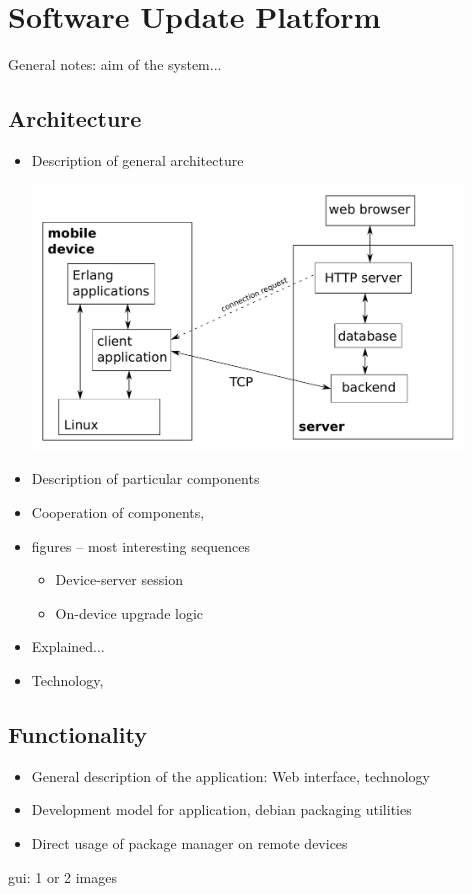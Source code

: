 \section{Software Update Platform}

General notes: aim of the system... 


\subsection{Architecture}

\begin{itemize}
	\item Description of general architecture

  \includegraphics[width=0.9\textwidth]{graphics/architecture.pdf}
	\item Description of particular components 
	\item Cooperation of components, 
	\item figures -- most interesting sequences 
    \begin{itemize}
    \item Device-server session
    \item On-device upgrade logic
    \end{itemize} 
	\item Explained... 
	\item Technology, 
\end{itemize}


\subsection{Functionality}

\begin{itemize}
	\item General description of the application: Web interface, technology 
    \item Development model for application, debian packaging utilities
    \item Direct usage of package manager on remote devices 
\end{itemize}

gui: 1 or 2 images 

